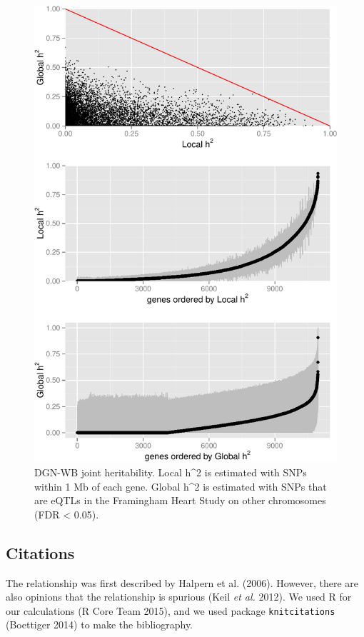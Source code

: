 \documentclass[]{article}
\begin{document}
\begin{figure}[htbp]
\centering
\includegraphics{GenArch_manuscript_files/figure-latex/jointH2-1.pdf}
\caption{DGN-WB joint heritability. Local h\^{}2 is estimated with SNPs
within 1 Mb of each gene. Global h\^{}2 is estimated with SNPs that are
eQTLs in the Framingham Heart Study on other chromosomes (FDR
\textless{} 0.05).}
\end{figure}

\subsection{Citations}\label{citations}

The relationship was first described by Halpern et al. (2006). However,
there are also opinions that the relationship is spurious (Keil \emph{et
al.} 2012). We used R for our calculations (R Core Team 2015), and we
used package \texttt{knitcitations} (Boettiger 2014) to make the
bibliography.
\end{document}

